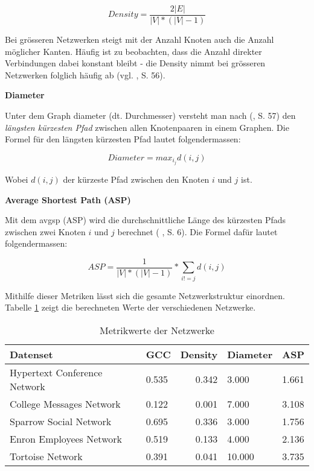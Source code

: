 \begin{equation}
    \label{eq:density}
    Density = \frac{2|E|}{|V|*(|V|-1)}
\end{equation}


Bei grösseren Netzwerken steigt mit der Anzahl Knoten auch die Anzahl möglicher Kanten.
Häufig ist zu beobachten, dass die Anzahl direkter Verbindungen dabei konstant bleibt - die Density nimmt bei grösseren Netzwerken folglich häufig ab (vgl. \citeauthor{michael_henninger_soziale_2018} \citeyear{michael_henninger_soziale_2018}, S. 56).

\textbf{Diameter}

Unter dem Graph \acs{diameter} (dt. Durchmesser) versteht man nach \citeauthor{michael_henninger_soziale_2018} (\citeyear{michael_henninger_soziale_2018}, S. 57) den \textit{längsten kürzesten Pfad} zwischen allen Knotenpaaren in einem Graphen.
Die Formel für den längsten kürzesten Pfad lautet folgendermassen:

\begin{equation}
    \label{eq:diameter}
    Diameter = max_i_jd(i,j)
\end{equation}

Wobei $d(i,j)$ der kürzeste Pfad zwischen den Knoten $i$ und $j$ ist.

\textbf{Average Shortest Path (ASP)}

Mit dem \acs{avgsp} (ASP) wird die durchschnittliche Länge des kürzesten Pfads zwischen zwei Knoten $i$ und $j$ berechnet (\citeauthor{gao_link_2015} \citeyear{gao_link_2015}, S. 6).
Die Formel dafür lautet folgendermassen:

\begin{equation}
    \label{eq:asp}
    ASP = \frac{1}{|V| * (|V| - 1)} * \sum\limits_{i!=j} d(i,j)
\end{equation}

Mithilfe dieser Metriken lässt sich die gesamte Netzwerkstruktur einordnen.
Tabelle \ref{tab_metrics} zeigt die berechneten Werte der verschiedenen Netzwerke.

\begin{table}[h]
    \centering
    \begin{tabular}{@{}llrll@{}}
        \toprule
        Datenset                         & GCC      & Density      & Diameter & ASP      \\ \midrule
        Hypertext Conference Network                & 0.535 & 0.342 & 3.000 & 1.661 \\
        College Messages Network         & 0.122 & 0.001 & 7.000 & 3.108 \\
        Sparrow Social Network           & 0.695 & 0.336 & 3.000 & 1.756 \\
        Enron Employees Network          & 0.519 & 0.133 & 4.000 & 2.136 \\
        Tortoise Network                 & 0.391 & 0.041 & 10.000 & 3.735 \\ \bottomrule
    \end{tabular}%
    \caption{Metrikwerte der Netzwerke}
    \label{tab_metrics}
\end{table}

